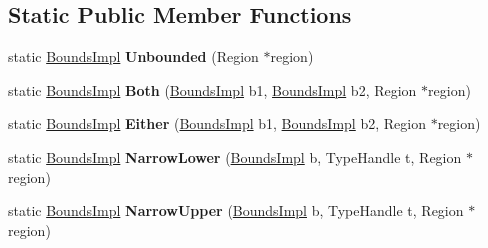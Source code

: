 \subsection*{Static Public Member Functions}
\begin{DoxyCompactItemize}
\item 
\hypertarget{structv8_1_1internal_1_1_bounds_impl_abb12ca29dd00a64e7edcffa7bd17d492}{}static \hyperlink{structv8_1_1internal_1_1_bounds_impl}{Bounds\+Impl} {\bfseries Unbounded} (Region $\ast$region)\label{structv8_1_1internal_1_1_bounds_impl_abb12ca29dd00a64e7edcffa7bd17d492}

\item 
\hypertarget{structv8_1_1internal_1_1_bounds_impl_a1616307121ef7a63b4069ebe0c9f8c1c}{}static \hyperlink{structv8_1_1internal_1_1_bounds_impl}{Bounds\+Impl} {\bfseries Both} (\hyperlink{structv8_1_1internal_1_1_bounds_impl}{Bounds\+Impl} b1, \hyperlink{structv8_1_1internal_1_1_bounds_impl}{Bounds\+Impl} b2, Region $\ast$region)\label{structv8_1_1internal_1_1_bounds_impl_a1616307121ef7a63b4069ebe0c9f8c1c}

\item 
\hypertarget{structv8_1_1internal_1_1_bounds_impl_afda06a1fe7974e54aa5eb2cfe5cf518f}{}static \hyperlink{structv8_1_1internal_1_1_bounds_impl}{Bounds\+Impl} {\bfseries Either} (\hyperlink{structv8_1_1internal_1_1_bounds_impl}{Bounds\+Impl} b1, \hyperlink{structv8_1_1internal_1_1_bounds_impl}{Bounds\+Impl} b2, Region $\ast$region)\label{structv8_1_1internal_1_1_bounds_impl_afda06a1fe7974e54aa5eb2cfe5cf518f}

\item 
\hypertarget{structv8_1_1internal_1_1_bounds_impl_a059b623d5bb3927121824b055d5f55fb}{}static \hyperlink{structv8_1_1internal_1_1_bounds_impl}{Bounds\+Impl} {\bfseries Narrow\+Lower} (\hyperlink{structv8_1_1internal_1_1_bounds_impl}{Bounds\+Impl} b, Type\+Handle t, Region $\ast$region)\label{structv8_1_1internal_1_1_bounds_impl_a059b623d5bb3927121824b055d5f55fb}

\item 
\hypertarget{structv8_1_1internal_1_1_bounds_impl_a24f1231317eb27591fcc5b2934befb3d}{}static \hyperlink{structv8_1_1internal_1_1_bounds_impl}{Bounds\+Impl} {\bfseries Narrow\+Upper} (\hyperlink{structv8_1_1internal_1_1_bounds_impl}{Bounds\+Impl} b, Type\+Handle t, Region $\ast$region)\label{structv8_1_1internal_1_1_bounds_impl_a24f1231317eb27591fcc5b2934befb3d}

\end{DoxyCompactItemize}
